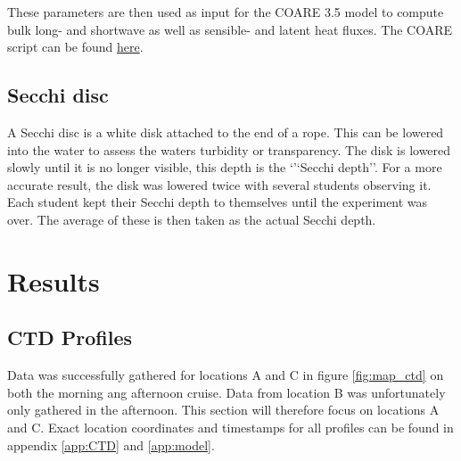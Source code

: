 \documentclass[a4paper,10pt,english]{article}
\begin{document}
These parameters are then used as input for the COARE 3.5 model to compute bulk long- and shortwave as well as sensible- and latent heat fluxes. The COARE script can be found \href{https://github.com/kaihc/GEO2320/blob/main/cruise/airsea_data.ipynb}{here}.

\subsection{Secchi disc}
A Secchi disc is a white disk attached to the end of a rope. This can be lowered into the water to assess the waters turbidity or transparency. The disk is lowered slowly until it is no longer visible, this depth is the `'`Secchi depth''. For a more accurate result, the disk was lowered twice with several students observing it. Each student kept their Secchi depth to themselves until the experiment was over. The average of these is then taken as the actual Secchi depth. 

\newpage
\section{Results}\label{sec:results}
\setlength{\intextsep}{12pt}


\subsection{CTD Profiles}
Data was successfully gathered for locations A and C in figure \ref*{fig:map_ctd} on both the morning ang afternoon cruise. Data from location B was unfortunately only gathered in the afternoon. This section will therefore focus on locations A and C. Exact location coordinates and timestamps for all profiles can be found in appendix \ref*{app:CTD} and \ref*{app:model}.
\end{document}
